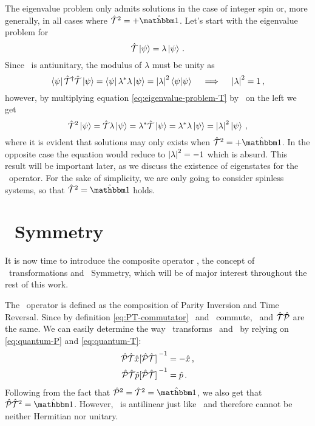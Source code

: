         The eigenvalue problem only admits solutions in the case of integer spin or, more generally, in all cases where $\hT^2 = +\togglehat{\idM}$. Let's start with the eigenvalue problem for \hT
        \begin{equation}
            \label{eq:eigenvalue-problem-T}
            \mathcal{\hat{T}} \ket{\psi} = \lambda \ket{\psi}
            \,\text{.}
        \end{equation}
        Since \hT\ is antiunitary, the modulus of $\lambda$ must be unity as
        \begin{equation*}
            \bra{\psi} \mathcal{\hat{T}}^\dag \mathcal{\hat{T}} \ket{\psi}
            = \bra{\psi} \lambda^* \lambda \ket{\psi}
            = \abs{\lambda}^2 \braket{\psi}{\psi}
            \quad\implies\quad
            \abs{\lambda}^2 = 1
            \,\text{,}
        \end{equation*}
        however, by multiplying equation \eqref{eq:eigenvalue-problem-T} by \hT\ on the left we get
        \begin{equation*}
            \mathcal{\hat{T}}^2 \ket{\psi}
            = \mathcal{\hat{T}} \lambda \ket{\psi}
            = \lambda^* \mathcal{\hat{T}} \ket{\psi}
            = \lambda^* \lambda \ket{\psi}
            = \abs{\lambda}^2 \ket{\psi}
            \,\text{,}
        \end{equation*}
        where it is evident that solutions may only exists when $\hT^2 = +\togglehat{\idM}$. In the opposite case the equation would reduce to $\abs{\lambda}^2 = -1$ which is absurd. This result will be important later, as we discuss the existence of eigenstates for the \hPT\ operator. For the sake of simplicity, we are only going to consider spinless systems, so that $\hT^2 = \togglehat{\idM}$ holds.

    \section{\PT\ Symmetry}
        It is now time to introduce the composite operator \hPT, the concept of \PT\ transformations and \PT\ Symmetry, which will be of major interest throughout the rest of this work.

        The \hPT\ operator is defined as the composition of Parity Inversion and Time Reversal. Since by definition \eqref{eq:PT-commutator} \hP\ and \hT\ commute, \hPT\ and $\mathcal{\hat{T}}\mathcal{\hat{P}}$ are the same. We can easily determine the way \hPT\ transforms \hx\ and \hp\ by relying on \eqref{eq:quantum-P} and \eqref{eq:quantum-T}:
        \begin{align}
            \label{eq:quantum-PT-x}
            \PTtransform{\hx}
            &= -\hx
            \mycomma
            \\
            \label{eq:quantum-PT-p}
            \PTtransform{\hp}
            &= \hp
            \myperiod
        \end{align}
        Following from the fact that $\hP^2 = \hT^2 = \togglehat{\idM}$, we also get that $\hPT^2 = \togglehat{\idM}$. However, \hPT\ is antilinear just like \hT\ and therefore cannot be neither Hermitian nor unitary.

